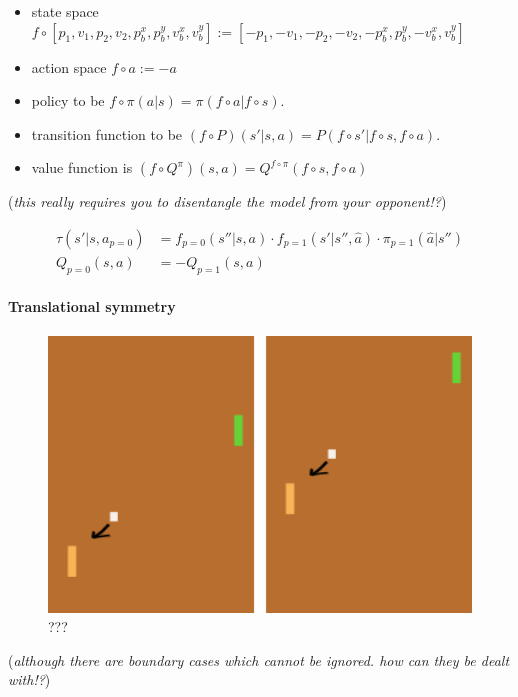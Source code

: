 \begin{itemize}
	\tightlist
	\item state space $f \circ [p_1, v_1, p_2, v_2, p^x_b, p^y_b, v^x_b, v^y_b] := [-p_1, -v_1, -p_2, -v_2, -p^x_b, p^y_b, -v^x_b, v^y_b]$
	\item action space $f \circ a := -a$
 	\item policy to be $f \circ \pi(a | s) = \pi(f \circ a | f \circ s)$.
	\item transition function to be $(f \circ P)(s' | s, a) = P(f \circ s'| f \circ s, f \circ a)$.
	\item value function is $(f \circ Q^{\pi})(s, a) = Q^{f \circ \pi}(f \circ s, f \circ a)$
\end{itemize}

(\emph{this really requires you to disentangle the model from your
opponent!?})

\begin{align*}
\tau(s'|s, a_{p=0}) &= f_{p=0}(s''|s, a) \cdot f_{p=1}(s'|s'', \hat a) \cdot \pi_{p=1}(\hat a|s'') \\
Q_{p=0}(s, a) &= -Q_{p=1}(s, a)
\end{align*}


\paragraph{Translational symmetry}

\begin{figure}
\centering
\includegraphics[width=1\textwidth,height=0.25\textheight]{../../pictures/drawings/pong-trans.png}
\caption{???}
\end{figure}

(\emph{although there are boundary cases which cannot be ignored. how
can they be dealt with!?})

